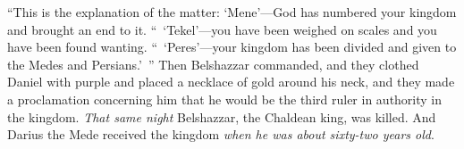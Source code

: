 \begin{biblechapter}
\verse “This is the explanation of the matter: ‘Mene’—God has numbered your kingdom and brought an end to it.
\verse “ ‘Tekel’—you have been weighed on scales and you have been found wanting.
\verse “ ‘Peres’—your kingdom has been divided and given to the Medes and Persians.’ ”
\verse Then Belshazzar commanded, and they clothed Daniel with purple and placed a necklace of gold around his neck, and they made a proclamation concerning him that he would be the third ruler in authority in the kingdom.
\verse \textit{That same night} Belshazzar, the Chaldean king, was killed.
\verse {} And Darius the Mede received the kingdom \textit{when he was about sixty-two years old}.
\end{biblechapter}

